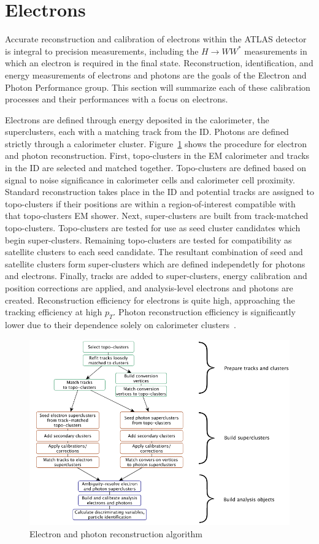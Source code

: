 \section{Electrons}
Accurate reconstruction and calibration of electrons within the ATLAS detector is integral to precision measurements, including the $H\rightarrow WW^*$ measurements in which an electron is required in the final state. Reconstruction, identification, and energy measurements of electrons and photons are the goals of the Electron and Photon Performance group.  This section will summarize each of these calibration processes and their performances with a focus on electrons. 

Electrons are defined through energy deposited in the calorimeter, the superclusters, each with a matching track from the ID. Photons are defined strictly through a calorimeter cluster. Figure~\ref{fig:ElectroReco} shows the procedure for electron and photon reconstruction. First, topo-clusters in the EM calorimeter and tracks in the ID are selected and matched together. Topo-clusters are defined based on signal to noise significance in calorimeter cells and calorimeter cell proximity. Standard reconstruction takes place in the ID and potential tracks are assigned to topo-clusters if their positions are within a region-of-interest compatible with that topo-clusters EM shower. Next, super-clusters are built from track-matched topo-clusters. Topo-clusters are tested for use as seed cluster candidates which begin super-clusters. Remaining topo-clusters are tested for compatibility as satellite clusters to each seed candidate. The resultant combination of seed and satellite clusters form super-clusters which are defined independetly for photons and electrons.  Finally, tracks are added to super-clusters, energy calibration and position corrections are applied, and analysis-level electrons and photons are created. Reconstruction efficiency for electrons is quite high, approaching the tracking efficiency at high $p_T$. Photon reconstruction efficiency is significantly lower due to their dependence solely on calorimeter clusters~\cite{ElectronPhotonPerformance}. 

\begin{figure}[!h]
        \centering
    \includegraphics[width=.6\textwidth]{Pictures/ElectroReco.png}
    \caption{ Electron and photon reconstruction algorithm~\cite{ElectronPhotonPerformance}}
    \label{fig:ElectroReco}
\end{figure}
 
